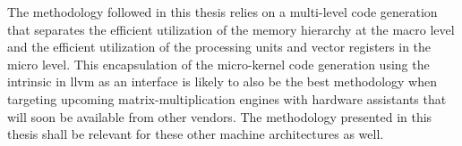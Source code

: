 \documentclass[\main/thesis.tex]{subfiles}
\begin{document}
The methodology followed in this thesis relies on a multi-level code generation that separates the efficient utilization of the memory hierarchy at the macro level and the efficient utilization of the processing units and vector registers in the micro level.
This encapsulation of the micro-kernel code generation using the  intrinsic in \gls{llvm} as an interface is likely to also be the best methodology when targeting upcoming matrix-multiplication engines with hardware assistants that will soon be available from other vendors. The methodology presented in this thesis shall be relevant for these other machine architectures as well.
\end{document}
